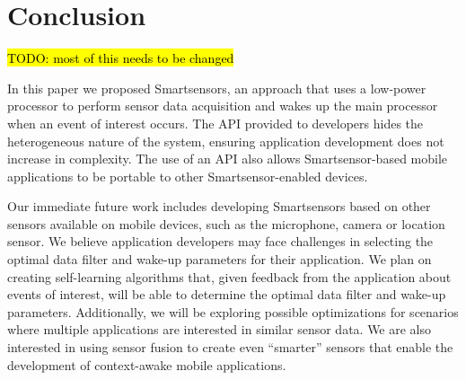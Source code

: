 \section{Conclusion}
\label{sec:conclusion}

\hl{TODO: most of this needs to be changed}

In this paper we proposed Smartsensors, an approach that uses a low-power processor to perform sensor data acquisition and wakes up the main processor when an event of interest occurs. The API provided to developers hides the heterogeneous nature of the system, ensuring application development does not increase in complexity. The use of an API also allows Smartsensor-based mobile applications to be portable to other Smartsensor-enabled devices.

Our immediate future work includes developing Smartsensors based on other sensors available on mobile devices, such as the microphone, camera or location sensor. We believe application developers may face challenges in selecting the optimal data filter and wake-up parameters for their application. We plan on creating self-learning algorithms that, given feedback from the application about events of interest, will be able to determine the optimal data filter and wake-up parameters. Additionally, we will be exploring possible optimizations for scenarios where multiple applications are interested in similar sensor data. We are also interested in using sensor fusion to create even ``smarter'' sensors that enable the development of context-awake mobile applications.
